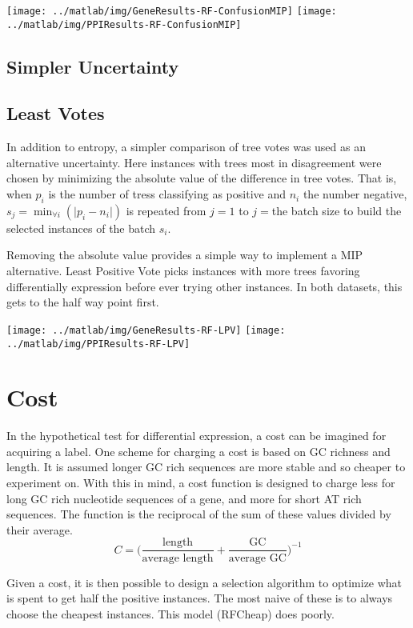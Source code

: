 \documentclass[10pt,a4pape r]{article}
\begin{document}
 \texttt{[image: ../matlab/img/GeneResults-RF-ConfusionMIP]} \texttt{[image: ../matlab/img/PPIResults-RF-ConfusionMIP]}\\

\subsection{Simpler Uncertainty}
\subsection{Least Votes}
In addition to entropy, a simpler comparison of tree votes was used as an alternative uncertainty. Here instances with trees most in disagreement were chosen by minimizing the absolute value of the difference in tree votes.  That is, when $p_i$ is the number of tress classifying as positive and $n_i$ the number negative, $s_j=\min_{\forall i}(\vert p_i-n_i\vert)$ is repeated from $j=1$ to $j=$the batch size to build the selected instances of the batch $s_i$.

Removing the absolute value provides a simple way to implement a MIP alternative. Least Positive Vote picks instances with more trees favoring differentially expression before ever trying other instances. In both datasets, this gets to the half way point first.

 \texttt{[image: ../matlab/img/GeneResults-RF-LPV]} \texttt{[image: ../matlab/img/PPIResults-RF-LPV]}

\section{Cost}
In the hypothetical test for differential expression, a cost can be imagined for acquiring a label. One scheme for charging a cost is based on GC richness and length. It is assumed longer GC rich sequences are more stable and so cheaper to experiment on. With this in mind, a cost function is designed to charge less for long GC rich nucleotide sequences of a gene, and more for short AT rich sequences. The function is the reciprocal of the sum of these values divided by their average.
\[ C = \big(\frac{\text{length}}{\text{average length}} + \frac{\text{GC}}{\text{average GC}}\big)^{-1} \]

Given a cost, it is then possible to design a selection algorithm to optimize what is spent to get half the positive instances. The most naive of these is to always choose the cheapest instances. This model (RFCheap) does poorly.
\end{document}
